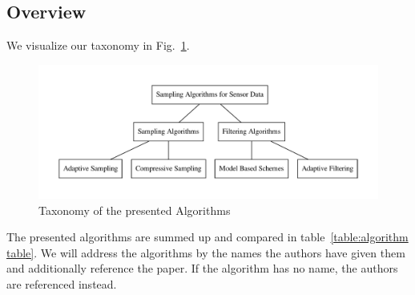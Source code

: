 

\subsection{Overview}
\label{sec:Overview}


We visualize our taxonomy in Fig.~\ref{fig:Taxonomy}.

\begin{figure}[h]
\includegraphics[width=\linewidth]{images/taxonomy.pdf}
\caption{Taxonomy of the presented Algorithms}
\label{fig:Taxonomy}
\centering
\end{figure}

\FloatBarrier

The presented algorithms are summed up and compared in
table~\ref{table:algorithm table}. We will address the algorithms by the names
the authors have given them and additionally reference the paper. If the
algorithm has no name, the authors are referenced instead.

